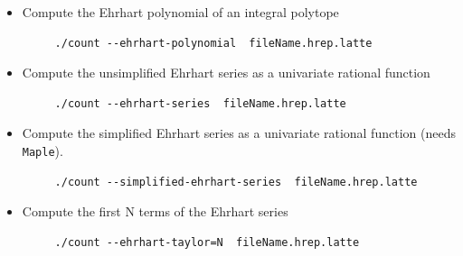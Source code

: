 \documentclass{article}
\newcommand{\maple}{{\tt Maple}\xspace}
\begin{document}
\begin{itemize}
	
	
\item Compute the Ehrhart polynomial of an integral polytope
	\begin{verbatim}
     ./count --ehrhart-polynomial  fileName.hrep.latte
	\end{verbatim} 
\item Compute the unsimplified Ehrhart series as a univariate rational function
	\begin{verbatim}
     ./count --ehrhart-series  fileName.hrep.latte
	\end{verbatim} 
\item Compute the simplified Ehrhart series as a univariate rational function (needs \maple).
	\begin{verbatim}
     ./count --simplified-ehrhart-series  fileName.hrep.latte
	\end{verbatim} 
\item Compute the first N terms of the Ehrhart series
	\begin{verbatim}
     ./count --ehrhart-taylor=N  fileName.hrep.latte
	\end{verbatim} 
\end{itemize}
\end{document}
